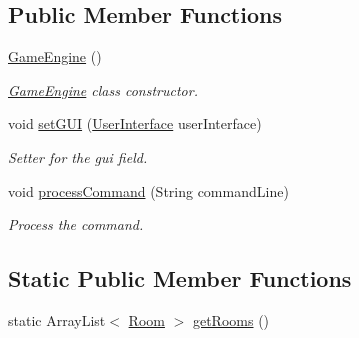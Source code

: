 \subsection*{Public Member Functions}
\begin{DoxyCompactItemize}
\item 
\hyperlink{classpkg__game_1_1GameEngine_a6b6494f73d268d0c394d819c8425f1d5}{Game\-Engine} ()
\begin{DoxyCompactList}\small\item\em \hyperlink{classpkg__game_1_1GameEngine}{Game\-Engine} class constructor. \end{DoxyCompactList}\item 
void \hyperlink{classpkg__game_1_1GameEngine_a0156eb9ee85fc086aef4da8594fb2891}{set\-G\-U\-I} (\hyperlink{classpkg__game_1_1UserInterface}{User\-Interface} user\-Interface)
\begin{DoxyCompactList}\small\item\em Setter for the gui field. \end{DoxyCompactList}\item 
void \hyperlink{classpkg__game_1_1GameEngine_a37887ae202eadba82495da82ac4e1908}{process\-Command} (String command\-Line)
\begin{DoxyCompactList}\small\item\em Process the command. \end{DoxyCompactList}\end{DoxyCompactItemize}
\subsection*{Static Public Member Functions}
\begin{DoxyCompactItemize}
\item 
static Array\-List$<$ \hyperlink{classpkg__world_1_1Room}{Room} $>$ \hyperlink{classpkg__game_1_1GameEngine_ae838a102ca62ef2bfd2e9d2d5ae98214}{get\-Rooms} ()
\end{DoxyCompactItemize}
